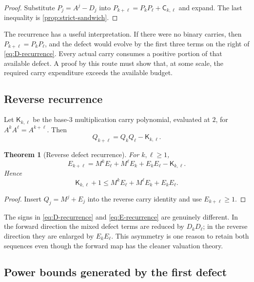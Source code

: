 \documentclass[11pt]{article}
\newtheorem{theorem}{Theorem}[section]
\theoremstyle{definition}
\theoremstyle{remark}
\newcommand{\carry}{\mathsf C}
\newcommand{\revcarry}{\mathsf K}
\begin{document}
\begin{proof}
Substitute $P_j=A^j-D_j$ into
$P_{k+\ell}=P_kP_\ell+\carry_{k,\ell}$ and expand.  The last inequality is
\cref{prop:strict-sandwich}.
\end{proof}

The recurrence has a useful interpretation.  If there were no binary carries,
then $P_{k+\ell}=P_kP_\ell$, and the defect would evolve by the first three
terms on the right of \eqref{eq:D-recurrence}.  Every actual carry consumes a
positive portion of that available defect.  A proof by this route must show
that, at some scale, the required carry expenditure exceeds the available
budget.

\subsection{Reverse recurrence}

Let $\revcarry_{k,\ell}$ be the base-$3$ multiplication carry polynomial,
evaluated at $2$, for $A^kA^\ell=A^{k+\ell}$.  Then
\[
 Q_{k+\ell}=Q_kQ_\ell-\revcarry_{k,\ell}.
\]

\begin{theorem}[Reverse defect recurrence]\label{thm:E-recurrence}
For $k,\ell\ge1$,
\begin{equation}\label{eq:E-recurrence}
 \boxed{
 E_{k+\ell}
 =M^kE_\ell+M^\ell E_k+E_kE_\ell-\revcarry_{k,\ell}.}
\end{equation}
Hence
\begin{equation}\label{eq:reverse-budget}
 \revcarry_{k,\ell}+1
 \le M^kE_\ell+M^\ell E_k+E_kE_\ell.
\end{equation}
\end{theorem}

\begin{proof}
Insert $Q_j=M^j+E_j$ into the reverse carry identity and use $E_{k+\ell}\ge1$.
\end{proof}

The signs in \eqref{eq:D-recurrence} and \eqref{eq:E-recurrence} are genuinely
different.  In the forward direction the mixed defect terms are reduced by
$D_kD_\ell$; in the reverse direction they are enlarged by $E_kE_\ell$.
This asymmetry is one reason to retain both sequences even though the forward
map has the cleaner valuation theory.

\subsection{Power bounds generated by the first defect}
\end{document}

